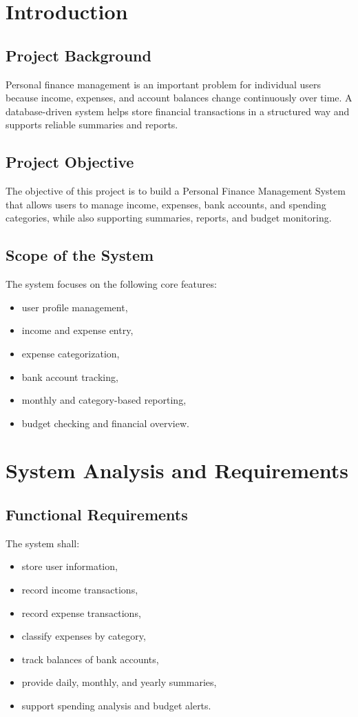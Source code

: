 \section{Introduction}

\subsection{Project Background}
Personal finance management is an important problem for individual users because income, expenses, and account balances change continuously over time. A database-driven system helps store financial transactions in a structured way and supports reliable summaries and reports.

\subsection{Project Objective}
The objective of this project is to build a Personal Finance Management System that allows users to manage income, expenses, bank accounts, and spending categories, while also supporting summaries, reports, and budget monitoring.

\subsection{Scope of the System}
The system focuses on the following core features:
\begin{itemize}
    \item user profile management,
    \item income and expense entry,
    \item expense categorization,
    \item bank account tracking,
    \item monthly and category-based reporting,
    \item budget checking and financial overview.
\end{itemize}

\section{System Analysis and Requirements}

\subsection{Functional Requirements}
The system shall:
\begin{itemize}
    \item store user information,
    \item record income transactions,
    \item record expense transactions,
    \item classify expenses by category,
    \item track balances of bank accounts,
    \item provide daily, monthly, and yearly summaries,
    \item support spending analysis and budget alerts.
\end{itemize}

